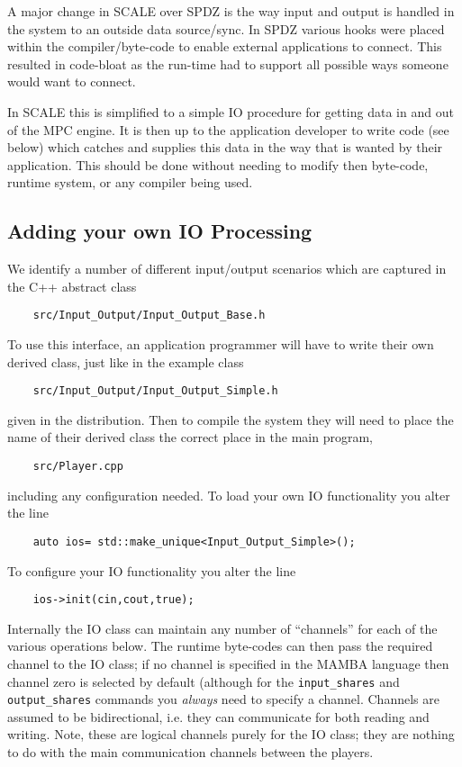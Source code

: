 \label{sec:IO}

A major change in SCALE over SPDZ is the way input and output
is handled in the system to an outside data source/sync.
In SPDZ various hooks were placed within the compiler/byte-code
to enable external applications to connect. This resulted in
code-bloat as the run-time had to support all possible
ways someone would want to connect.

In SCALE this is simplified to a simple IO procedure for
getting data in and out of the MPC engine. It is then up
to the application developer to write code (see below)
which catches and supplies this data in the way that is
wanted by their application.
This should be done without needing to modify then byte-code,
runtime system, or any compiler being used.

\subsection{Adding your own IO Processing}
We identify a number of different input/output scenarios
which are captured in the C++ abstract class
\begin{verbatim}
    src/Input_Output/Input_Output_Base.h
\end{verbatim}
To use this interface, an application programmer will have to
write their own derived class, just like in the example
class
\begin{verbatim}
    src/Input_Output/Input_Output_Simple.h
\end{verbatim}
given in the distribution.
Then to compile the system they will need to place the
name of their derived class the correct place in the
main program,
\begin{verbatim}
    src/Player.cpp
\end{verbatim}
including any configuration needed.
To load your own IO functionality you alter the line
\begin{verbatim}
    auto ios= std::make_unique<Input_Output_Simple>();
\end{verbatim}
To configure your IO functionality you alter the line
\begin{verbatim}
    ios->init(cin,cout,true);
\end{verbatim}
Internally the IO class can maintain any number of ``channels''
for each of the various operations below.
The runtime byte-codes can then pass the required channel to the
IO class; if no channel is specified in the MAMBA language
then channel zero is selected by default (although for
the \verb+input_shares+ and \verb+output_shares+ commands
you {\em always} need to specify a channel.
Channels are assumed to be bidirectional, i.e. they can
communicate for both reading and writing.
Note, these are logical channels purely for the IO class;
they are nothing to do with the main communication channels
between the players.

